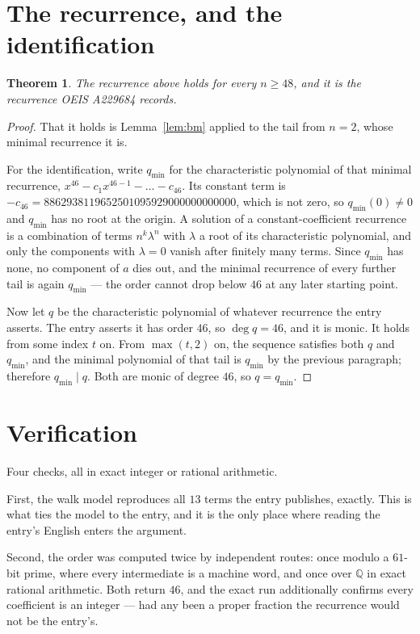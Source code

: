 \documentclass[11pt,a4paper]{article}
\theoremstyle{plain}
\newtheorem{theorem}{Theorem}
\theoremstyle{definition}
\begin{document}
\section{The recurrence, and the identification}

\begin{theorem}
The recurrence above holds for every $n\ge48$, and it is the recurrence OEIS A229684 records.
\end{theorem}

\begin{proof}
That it holds is Lemma~\ref{lem:bm} applied to the tail from $n=2$, whose minimal
recurrence it is.

For the identification, write $q_{\min}$ for the characteristic polynomial of that minimal
recurrence, $x^{46}-c_1x^{46-1}-\dots-c_{46}$. Its constant term is
$-c_{46}=8862938119652501095929000000000000$, which is not zero, so $q_{\min}(0)\neq0$ and $q_{\min}$ has no
root at the origin. A solution of a constant-coefficient recurrence is a combination of terms
$n^{k}\lambda^{n}$ with $\lambda$ a root of its characteristic polynomial, and only the
components with $\lambda=0$ vanish after finitely many terms. Since $q_{\min}$ has none, no
component of $a$ dies out, and the minimal recurrence of every further tail is again
$q_{\min}$ --- the order cannot drop below $46$ at any later starting point.

Now let $q$ be the characteristic polynomial of whatever recurrence the entry asserts. The
entry asserts it has order $46$, so $\deg q=46$, and it is monic. It holds from some
index $t$ on. From $\max(t,2)$ on, the sequence satisfies both $q$ and $q_{\min}$, and
the minimal polynomial of that tail is $q_{\min}$ by the previous paragraph; therefore
$q_{\min}\mid q$. Both are monic of degree $46$, so $q=q_{\min}$.
\end{proof}

\section{Verification}

Four checks, all in exact integer or rational arithmetic.

First, the walk model reproduces all $13$ terms the entry publishes, exactly. This is
what ties the model to the entry, and it is the only place where reading the entry's English
enters the argument.

Second, the order was computed twice by independent routes: once modulo a $61$-bit prime, where
every intermediate is a machine word, and once over $\mathbb{Q}$ in exact rational arithmetic.
Both return $46$, and the exact run additionally confirms every coefficient is an integer
--- had any been a proper fraction the recurrence would not be the entry's.
\end{document}
